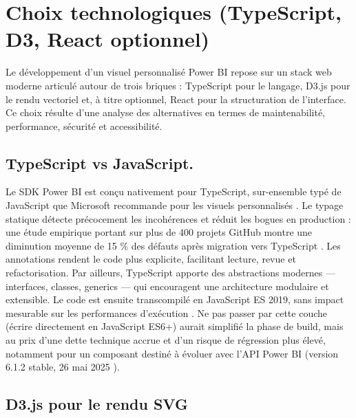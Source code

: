 \section{Choix technologiques (TypeScript, D3, React optionnel)}
\label{sec:techno}

Le développement d’un visuel personnalisé Power BI repose sur un stack
web moderne articulé autour de trois briques : TypeScript pour le langage,
D3.js pour le rendu vectoriel et, à titre optionnel, React pour la
structuration de l’interface. Ce choix résulte d’une analyse des
alternatives en termes de maintenabilité, performance, sécurité et
accessibilité.

\subsection{TypeScript vs JavaScript.}
Le SDK Power BI est conçu nativement pour TypeScript, sur-ensemble typé de
JavaScript que Microsoft recommande pour les visuels personnalisés
\parencite{MicrosoftPBISDKTS2025}. Le typage statique détecte précocement
les incohérences et réduit les bogues en production : une étude
empirique portant sur plus de 400 projets GitHub montre une diminution
moyenne de 15 \% des défauts après migration vers TypeScript
\parencite{BeyerEtAl2023}. Les annotations rendent le code plus explicite,
facilitant lecture, revue et refactorisation. Par ailleurs, TypeScript
apporte des abstractions modernes — interfaces, classes, generics —
qui encouragent une architecture modulaire et extensible. Le code est
ensuite transcompilé en JavaScript ES 2019, sans impact mesurable sur les
performances d’exécution \parencite{EcmaBenchmark2024}. Ne pas passer par
cette couche (écrire directement en JavaScript ES6+) aurait simplifié la
phase de build, mais au prix d’une dette technique accrue et d’un risque de
régression plus élevé, notamment pour un composant destiné à évoluer avec
l’API Power BI (version 6.1.2 stable, 26 mai 2025 \parencite{MicrosoftDocsSDK2025}).

\subsection{D3.js pour le rendu SVG}

